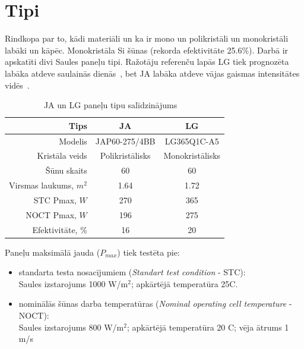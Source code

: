 
\section{Tipi} \label{section:tipi}

Rindkopa par to, kādi materiāli un ka ir mono un polikristāli un monokristāli labāki un kāpēc.
Monokristāla Si šūnas (rekorda efektivitāte 25.6\%).
Darbā ir apskatīti divi Saules paneļu tipi. Ražotāju referenču lapās LG tiek prognozēta labāka atdeve saulainās dienās~\cite{LGtips}, bet JA labāka atdeve vājas gaismas intensitātes vidēs~\cite{JAtips}.

\begin{table}[h]
    \caption{JA un LG paneļu tipu salīdzinājums~\cite{JAtips}~\cite{LGtips}} %
    \begin{center}
    \begin{tabular}{| r | c | c |}
    \hline
    Tips & JA & LG \\ \hline
    Modelis &  JAP60-275/4BB & LG365Q1C-A5\\ \hline
	Kristāla veids & Polikristālisks & Monokristālisks \\ \hline
	Šūnu skaits  &60  &60 \\ \hline
	Virsmas laukums, $m^2$ &1.64  &1.72 \\ \hline
	STC Pmax, $W$ 	&270 &365\\ \hline
	NOCT Pmax, $W$  &196 &275\\ \hline
	Efektivitāte, \% &16 & 20\\ \hline
    \end{tabular}
    \end{center}
    \label{tab:ja_lg_tipi}
\end{table}

Paneļu maksimālā jauda ($P_{max}$) tiek testēta pie:
\begin{itemize}
\item standarta testa nosacījumiem (\textit{Standart test condition} - STC):\\
Saules izstarojums 1000 W/m$^2$; apkārtējā temperatūra 25\textdegree C.
\item nominālās šūnas darba temperatūras (\textit{Nominal operating cell temperature} - NOCT):\\
Saules izstarojums 800 W/m$^2$; apkārtējā temperatūra 20 \textdegree C; vēja ātrums 1 m/s
\end{itemize}

